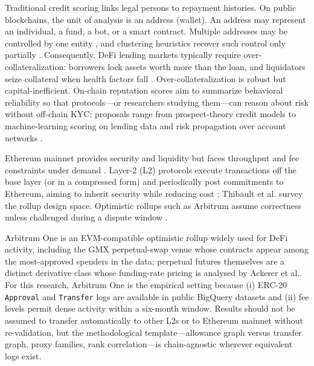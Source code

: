 
Traditional credit scoring links legal persons to repayment histories. On public blockchains, the unit of analysis is an address (wallet). An address may represent an individual, a fund, a bot, or a smart contract. Multiple addresses may be controlled by one entity , and clustering heuristics recover such control only partially . Consequently, DeFi lending markets typically require over-collateralization: borrowers lock assets worth more than the loan, and liquidators seize collateral when health factors fall . Over-collateralization is robust but capital-inefficient. On-chain reputation scores aim to summarize behavioral reliability so that protocols---or researchers studying them---can reason about risk without off-chain KYC; proposals range from prospect-theory credit models  to machine-learning scoring on lending data  and risk propagation over account networks .


Ethereum mainnet provides security and liquidity but faces throughput and fee constraints under demand . Layer-2 (L2) protocols execute transactions off the base layer (or in a compressed form) and periodically post commitments to Ethereum, aiming to inherit security while reducing cost ; Thibault et al. survey the rollup design space. Optimistic rollups such as Arbitrum assume correctness unless challenged during a dispute window .

Arbitrum One is an EVM-compatible optimistic rollup widely used for DeFi activity, including the GMX perpetual-swap venue  whose contracts appear among the most-approved spenders in the data; perpetual futures themselves are a distinct derivative class whose funding-rate pricing is analysed by Ackerer et al.. For this research, Arbitrum One is the empirical setting because (i) ERC-20 \texttt{Approval} and \texttt{Transfer} logs are available in public BigQuery datasets and (ii) fee levels permit dense activity within a six-month window. Results should not be assumed to transfer automatically to other L2s or to Ethereum mainnet without re-validation, but the methodological template---allowance graph versus transfer graph, proxy families, rank correlation---is chain-agnostic wherever equivalent logs exist.

